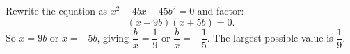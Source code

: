 Rewrite the equation as $x^2-4bx-45b^2=0$ and factor:
\[
(x-9b)(x+5b)=0 .
\]
So $x=9b$ or $x=-5b$, giving $\dfrac{b}{x}=\dfrac{1}{9}$ or $\dfrac{b}{x}=-\dfrac{1}{5}$. The largest possible value is $\boxed{\dfrac{1}{9}}$.
